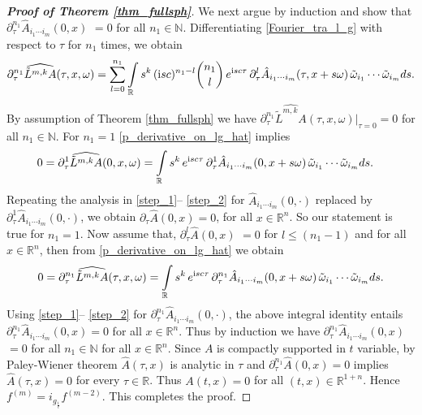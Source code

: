 \documentclass[11pt,a4paper,reqno]{amsart}
\renewcommand{\i}{\mathrm{i}}
\newcommand{\R}{\mathbb{R}}
\newcommand{\Nt}{\mathbb{N}}
\newcommand{\PD}{\partial}
\begin{document}
\begin{proof}[\textbf{Proof of Theorem \ref{thm_fullsph}}]
		We next argue by induction and show that  $ \PD^{n_1}_{\tau} \hat{A}_{i_1\cdots i_m}(0,x)$ $=0 $ for all $n_1\in \mathbb{N}$.
		Differentiating \eqref{Fourier_tra_l_g} with respect to $\tau$ for $n_1$ times, we obtain
		\begin{align}\label{p_derivative_on_lg_hat}
			\PD^{n_1}_{\tau}  \widehat{\tilde{L}^{m,k}A}(\tau,x,\omega)= \sum\limits_{l=0}^{n_1} \int\limits_{\mathbb{R}} s^k\,  (\i sc )^{n_1-l} \binom{n_1}{l}\, e^{\i sc \tau}\, \PD^l_{\tau} \hat{A}_{i_1\cdots i_m}(\tau,x+s\omega)\, \Tilde{\omega}_{i_1}\cdots \Tilde{\omega}_{i_m}  ds. 
		\end{align}
		By assumption of Theorem \ref{thm_fullsph} we have $ \PD^{n_1}_{\tau}  \widehat{\tilde{L}^{m,k}A}(\tau,x,\omega)|_{\tau=0}=0$ for all $n_1\in \Nt$. 
		For $n_1=1$ \eqref{p_derivative_on_lg_hat} implies 
		\begin{align*}
			0= \PD^{1}_{\tau}  \widehat{\tilde{L}^{m,k}A}(0,x,\omega)
			&= \int\limits_{\mathbb{R}} s^k\,    e^{\i sc \tau}\, \PD^1_{\tau} \hat{A}_{i_1\cdots i_m}(0,x+s\omega) \,\Tilde{\omega}_{i_1}\cdots \Tilde{\omega}_{i_m} ds.
		\end{align*}
		Repeating the analysis in \eqref{step_1}-- \eqref{step_2} for $\hat{A}_{i_1\cdots i_m}(0,\cdot)$ replaced by $\PD^1_{\tau}\hat{A}_{i_1\cdots i_m}(0,\cdot)$, we obtain $\PD_{\tau} \hat{A}(0,x)=0$, for all $x\in \R^n$. So our statement is true for $n_1=1$.
		Now assume that, $\PD^{l}_{\tau}\hat{A}(0,x)$ $=0$ for $l\leq (n_1-1)$ and for all $x\in \R^n$, then from \eqref{p_derivative_on_lg_hat} we obtain
		\begin{align*}
			0= \PD^{n_1}_{\tau}  \widehat{\tilde{L}^{m,k}A}(\tau,x,\omega)
			=\int\limits_{\mathbb{R}} s^k\,    e^{\i sc \tau}\, \PD^{n_1}_{\tau} \hat{A}_{i_1\cdots i_m}(0,x+s\omega)\, \Tilde{\omega}_{i_1}\cdots \Tilde{\omega}_{i_m} ds.    
		\end{align*}
		Using \eqref{step_1}-- \eqref{step_2} for $\PD^{n_1}_{\tau}\hat{A}_{i_1\cdots i_m}(0,\cdot)$, the above integral identity entails $\PD^{n_1}_{\tau} \hat{A}_{i_1\cdots i_m}(0,x)=0 $ for all $x\in \R^n$. Thus by induction we have $ \PD^{n_1}_{\tau} \hat{A}_{i_1\cdots i_m}(0,x)$ $=0 $ for all $n_1 \in \Nt$ for all $x\in \R^n$. Since $A$ is compactly supported in $t$ variable, by Paley-Wiener theorem $ \hat{A}(\tau,x)$ is analytic in $\tau$ and $ \PD^{n_1}_{\tau}\hat{A}(0,x)=0$ implies $ \hat{A}(\tau,x)=0$ for every $\tau \in \R$. Thus $A(t,x)=0$ for all $(t,x)\in \R^{1+n}$. Hence $f^{(m)} =i_{g_{\frac{1}{c}}}f^{(m-2)}$. This completes the proof.
	\end{proof}
\end{document}
